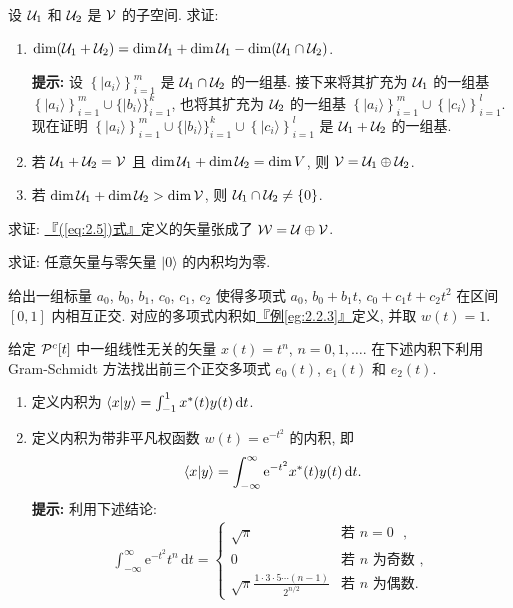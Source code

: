 \documentclass[lang=cn,zihao=-4,twoside,fontset=none]{textbook}
\newcommand{\gt}{>}
\def\eq#1{\[\begin{aligned}{}#1\end{aligned}\]}
\renewcommand{\eqref}[1]{\hyperref[#1]{『\textnormal{(\ref*{#1})}式』}}
\newcommand{\egref}[1]{\hyperref[#1]{『例\textnormal{\ref*{#1}}』}}
\newcommand{\set}[1]{\{#1\}}
\newcommand{\Set}[1]{\left\{#1\right\}}
\newcommand{\ee}{{\mathrm{e}}}
\renewcommand{\dd}{{\mathrm{d}}}
\renewcommand{\ket}[1]{| #1 \rangle}
\begin{document}
\begin{problem}
    \label{ex:2.8}%
    设 ${\mathcal U}_1$ 和 ${\mathcal U}_2$ 是 ${\mathcal V}$ 的子空间. 求证:
    \begin{enumerate}[label=\textnormal{(\alph*)}]
        \item $\dim({\mathcal U}_1+{\mathcal U}_2)=\dim{\mathcal U}_1+\dim{\mathcal U}_1-\dim({\mathcal U}_1\cap{\mathcal U}_2)$.
        
        \textbf{提示:} 设 $\Set{\ket{a_i}}_{i=1}^m$ 是 ${\mathcal U}_1\cap{\mathcal U}_2$ 的一组基. 接下来将其扩充为 ${\mathcal U}_1$ 的一组基 $\Set{\ket{a_i}}_{i=1}^m\cup\set{\ket{b_i}}_{i=1}^k$, 也将其扩充为 ${\mathcal U}_2$ 的一组基 $\Set{\ket{a_i}}_{i=1}^m\cup\Set{\ket{c_i}}_{i=1}^l$. 现在证明 $\Set{\ket{a_i}}_{i=1}^m\cup\set{\ket{b_i}}_{i=1}^k\cup \Set{\ket{c_i}}_{i=1}^l$ 是 ${\mathcal U}_1+{\mathcal U}_2$ 的一组基. 
        \item 若 ${\mathcal U}_1+{\mathcal U}_2={\mathcal V}$ 且 $\dim{\mathcal U}_1+\dim{\mathcal U}_2=\dim V$, 则 ${\mathcal V}={\mathcal U}_1\oplus{\mathcal U}_2$.
        \item 若 $\dim\mU_1+\dim\mU_2\gt\dim\mV$, 则 $\mU_1\cap\mU_2\neq\set{0}$.
    \end{enumerate}
\end{problem}

\begin{problem}
    \label{ex:2.9}%
    求证: \eqref{eq:2.5}定义的矢量张成了 ${\mathcal W}={\mathcal U}\oplus{\mathcal V}$.
\end{problem}

\begin{problem}
    \label{ex:2.10}%
    求证: 任意矢量与零矢量 $\ket{0}$ 的内积均为零.
\end{problem}

\begin{problem}
    \label{ex:2.11}%
    给出一组标量 $a_0$, $b_0$, $b_1$, $c_0$, $c_1$, $c_2$ 使得多项式 $a_0$, $b_0+b_1t$, $c_0+c_1t+c_2t^2$ 在区间 $[0,1]$ 内相互正交. 对应的多项式内积如\egref{eg:2.2.3}定义, 并取 $w(t)=1$.
\end{problem}

\begin{problem}
    \label{ex:2.12}%
    给定 ${\mathcal P}^c[t]$ 中一组线性无关的矢量 $x(t)=t^n$, $n=0,1,\dots$. 在下述内积下利用 Gram-Schmidt 方法找出前三个正交多项式 $e_0(t)$, $e_1(t)$ 和 $e_2(t)$. 
    \begin{enumerate}[label=\textnormal{(\alph*)}]
        \item 定义内积为 $\braket{x }{y}=\int_{-1}^1 x^*(t)y(t)\,\dd t$.
        \item 定义内积为带非平凡权函数 $w(t)=\ee^{-t^2}$ 的内积, 即 
        \eq{
            \braket{x }{y}=\int_{-\infty}^\infty \ee^{-t^2} x^*(t) y(t) \, \dd t. 
        }
        \textbf{提示:} 利用下述结论:
        \eq{
            \int_{-\infty}^\infty \ee^{-t^2} t^n \, \dd t = \begin{cases}
                \sqrt{\pi} & \text{若 $n=0$ },\\
                0 & \text{若 $n$ 为奇数 },\\
                \sqrt{\pi}\frac{1\cdot3\cdot5\cdots(n-1)}{2^{n/2}} & \text{若 $n$ 为偶数}. 
            \end{cases}
        }
    \end{enumerate}
\end{problem}
\end{document}
